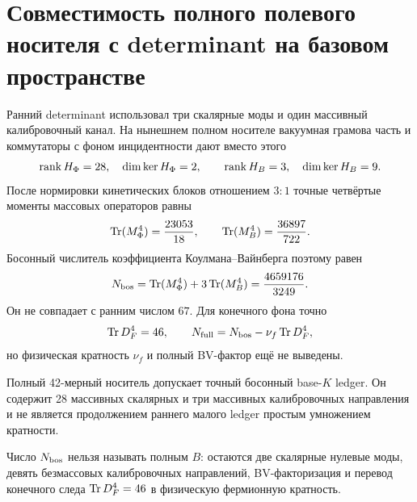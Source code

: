 \chapter{Совместимость полного полевого носителя с determinant на базовом пространстве}
\label{ch:v8-full-42-carrier-base-k-determinant-compatibility-gate}

Ранний determinant использовал три скалярные моды и один массивный
калибровочный канал. На нынешнем полном носителе вакуумная грамова часть и
коммутаторы с фоном инцидентности дают вместо этого
\begin{equation}
 \operatorname{rank} H_{\Phi}=28,\quad\dim\ker H_{\Phi}=2,
 \qquad \operatorname{rank} H_B=3,\quad\dim\ker H_B=9.
 \label{eq:v8-full-carrier-vacuum-ranks}
\end{equation}
После нормировки кинетических блоков отношением $3:1$ точные четвёртые
моменты массовых операторов равны
\begin{equation}
 \operatorname{Tr}(M_{\Phi}^4)=\frac{23053}{18},
 \qquad \operatorname{Tr}(M_B^4)=\frac{36897}{722}.
 \label{eq:v8-full-carrier-fourth-moments}
\end{equation}
Босонный числитель коэффициента Коулмана--Вайнберга поэтому равен
\begin{equation}
 N_{\rm bos}=\operatorname{Tr}(M_{\Phi}^4)+3\operatorname{Tr}(M_B^4)
 =\frac{4659176}{3249}.
 \label{eq:v8-full-carrier-bosonic-ledger}
\end{equation}
Он не совпадает с ранним числом $67$. Для конечного фона точно
\begin{equation}
 \operatorname{Tr} D_F^4=46,
 \qquad N_{\rm full}=N_{\rm bos}-\nu_f\operatorname{Tr} D_F^4,
 \label{eq:v8-full-carrier-fermion-boundary}
\end{equation}
но физическая кратность $\nu_f$ и полный BV-фактор ещё не выведены.

\begin{theorem}
Полный 42-мерный носитель допускает точный босонный base-$K$ ledger. Он
содержит 28 массивных скалярных и три массивных калибровочных направления и
не является продолжением раннего малого ledger простым умножением кратности.
\end{theorem}

\begin{nogocriterion}
Число $N_{\rm bos}$ нельзя называть полным $B$: остаются две скалярные
нулевые моды, девять безмассовых калибровочных направлений, BV-факторизация
и перевод конечного следа $\operatorname{Tr} D_F^4=46$ в физическую фермионную кратность.
\end{nogocriterion}

